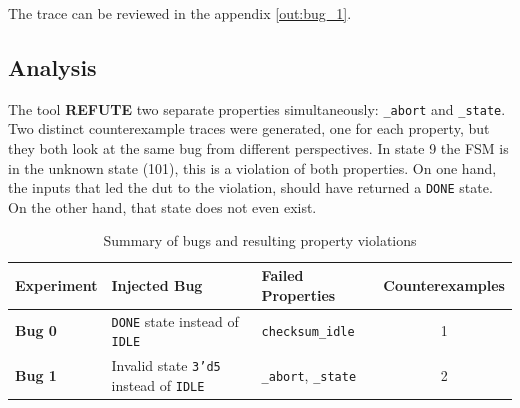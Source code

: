 The trace can be reviewed in the appendix \ref{out:bug_1}.

\subsection*{Analysis}
The tool \textbf{REFUTE} two separate properties simultaneously: \texttt{\_abort} and \texttt{\_state}.
Two distinct counterexample traces were generated, one for each property, but they both look at the same bug from different perspectives.
In state 9 the FSM is in the unknown state (101), this is a violation of both properties.
On one hand, the inputs that led the dut to the violation, should have returned a \texttt{DONE} state. 
On the other hand, that state does not even exist.

\begin{table}[h]
    \centering
    \begin{tabular}{@{}lllc@{}}
        \toprule
        \textbf{Experiment} & \textbf{Injected Bug} & \textbf{Failed Properties} & \textbf{Counterexamples} \\
        \midrule
        \textbf{Bug 0} & \texttt{DONE} state instead of \texttt{IDLE} & \texttt{checksum\_idle} & 1 \\
        \textbf{Bug 1} & Invalid state \texttt{3'd5} instead of \texttt{IDLE} & \texttt{\_abort}, \texttt{\_state} & 2 \\
        \bottomrule
    \end{tabular}
    \caption{Summary of bugs and resulting property violations}
    \label{tab:bug_summary}
\end{table}